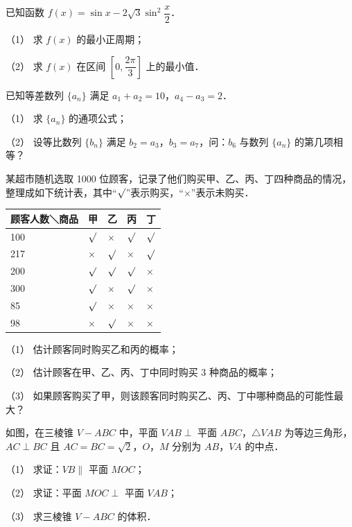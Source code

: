 \begin{question}
已知函数 \(f(x)=\sin x-2\sqrt{3}\sin^{2}\dfrac{x}{2}\)．

（1） 求 \(f(x)\) 的最小正周期；

（2） 求 \(f(x)\) 在区间 \(\left[0,\dfrac{2\pi}{3}\right]\) 上的最小值．

\end{question}
\begin{question}
已知等差数列 \(\{a_{n}\}\) 满足 \(a_{1}+a_{2}=10\)，\(a_{4}-a_{3}=2\)．

（1） 求 \(\{a_{n}\}\) 的通项公式；

（2） 设等比数列 \(\{b_{n}\}\) 满足 \(b_{2}=a_{3}\)，\(b_{3}=a_{7}\)，问：\(b_{6}\) 与数列 \(\{a_{n}\}\) 的第几项相等？

\end{question}
\begin{question}
某超市随机选取 1000 位顾客，记录了他们购买甲、乙、丙、丁四种商品的情况，整理成如下统计表，其中“\(\surd\)”表示购买，“\(\times\)”表示未购买．

\begin{center}
\begin{tabular}{lllll}
\toprule
顾客人数＼商品 & 甲 & 乙 & 丙 & 丁 \\
\midrule
100 & \(\surd\) & \(\times\) & \(\surd\) & \(\surd\) \\
217 & \(\times\) & \(\surd\) & \(\times\) & \(\surd\) \\
200 & \(\surd\) & \(\surd\) & \(\surd\) & \(\times\) \\
300 & \(\surd\) & \(\times\) & \(\surd\) & \(\times\) \\
85 & \(\surd\) & \(\times\) & \(\times\) & \(\times\) \\
98 & \(\times\) & \(\surd\) & \(\times\) & \(\times\) \\
\bottomrule
\end{tabular}
\end{center}

（1） 估计顾客同时购买乙和丙的概率；

（2） 估计顾客在甲、乙、丙、丁中同时购买 3 种商品的概率；

（3） 如果顾客购买了甲，则该顾客同时购买乙、丙、丁中哪种商品的可能性最大？

\Needspace{0.4\textheight}
\end{question}
\begin{question}
如图，在三棱锥 \(V-ABC\) 中，平面 \(VAB\perp\) 平面 \(ABC\)，\(\triangle VAB\) 为等边三角形，\(AC\perp BC\) 且 \(AC=BC=\sqrt{2}\)，\(O\)，\(M\) 分别为 \(AB\)，\(VA\) 的中点．
\nopagebreak[4]
\begin{center}\end{center}
\nopagebreak[4]
（1） 求证：\(VB\parallel\) 平面 \(MOC\)；

（2） 求证：平面 \(MOC\perp\) 平面 \(VAB\)；

（3） 求三棱锥 \(V-ABC\) 的体积．

\end{question}
